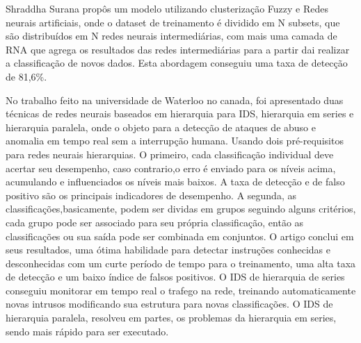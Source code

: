Shraddha Surana propôs um modelo \cite{Surana} utilizando clusterização Fuzzy e Redes neurais artificiais, onde o dataset de treinamento é dividido em N subsets, que são distribuídos em N redes neurais intermediárias, com mais uma camada de RNA que agrega os resultados das redes intermediárias para a partir dai realizar a classificação de novos dados. Esta abordagem conseguiu uma taxa de detecção de 81,6\%.

No trabalho feito na universidade de Waterloo no canada\cite{Chunlin}, foi apresentado duas técnicas de redes neurais baseados em hierarquia para IDS, hierarquia em series e hierarquia paralela, onde o objeto para a detecção de ataques de abuso e anomalia em tempo real sem a interrupção humana.
Usando dois pré-requisitos para redes neurais hierarquias. O primeiro, cada classificação individual deve acertar seu desempenho, caso contrario,o erro é enviado para os níveis acima, acumulando e influenciados os níveis mais baixos. A taxa de detecção e de falso positivo são os principais indicadores de desempenho. 
A segunda, as classificações,basicamente, podem ser dividas em grupos seguindo alguns critérios, cada grupo pode ser associado para seu própria classificação, então as classificações ou sua saída pode ser combinada em conjuntos.
O artigo conclui em seus resultados, uma ótima habilidade para detectar instruções conhecidas e desconhecidas com um curte período de tempo para o treinamento, uma alta taxa de detecção e um baixo índice de falsos positivos.
O IDS de hierarquia de series conseguiu monitorar em tempo real o trafego na rede, treinando automaticamente novas intrusos modificando sua estrutura para novas classificações. O IDS de hierarquia paralela, resolveu em partes, os problemas da hierarquia em series, sendo mais rápido para ser executado.